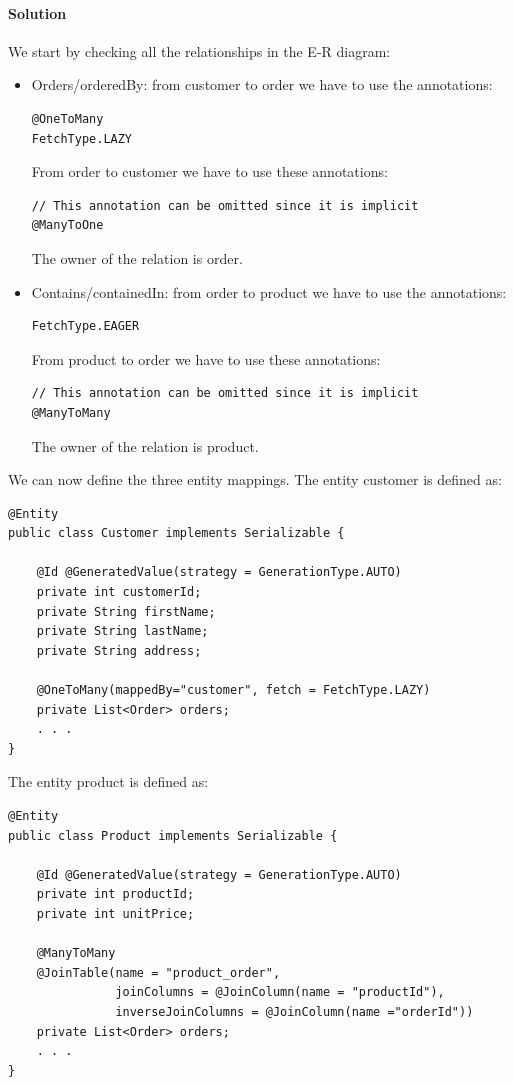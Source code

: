 \paragraph*{Solution}
We start by checking all the relationships in the E-R diagram: 
\begin{itemize}
    \item Orders/orderedBy: from customer to order we have to use the annotations: 
        \begin{lstlisting}[style=Java]
@OneToMany
FetchType.LAZY
        \end{lstlisting}
        From order to customer we have to use these annotations: 
        \begin{lstlisting}[style=Java]
// This annotation can be omitted since it is implicit
@ManyToOne
        \end{lstlisting}
        The owner of the relation is order. 
    \item Contains/containedIn: from order to product we have to use the annotations: 
        \begin{lstlisting}[style=Java]
FetchType.EAGER
        \end{lstlisting}
        From product to order we have to use these annotations: 
        \begin{lstlisting}[style=Java]
// This annotation can be omitted since it is implicit
@ManyToMany
        \end{lstlisting}
        The owner of the relation is product. 
\end{itemize}
We can now define the three entity mappings. 
The entity customer is defined as:  
\begin{lstlisting}[style=Java]
@Entity
public class Customer implements Serializable {

    @Id @GeneratedValue(strategy = GenerationType.AUTO)
    private int customerId;
    private String firstName;
    private String lastName;
    private String address;

    @OneToMany(mappedBy="customer", fetch = FetchType.LAZY)
    private List<Order> orders;
    . . .
}
\end{lstlisting}
The entity product is defined as:  
\begin{lstlisting}[style=Java]
@Entity
public class Product implements Serializable {

    @Id @GeneratedValue(strategy = GenerationType.AUTO)
    private int productId;
    private int unitPrice;

    @ManyToMany
    @JoinTable(name = "product_order",
               joinColumns = @JoinColumn(name = "productId"),
               inverseJoinColumns = @JoinColumn(name ="orderId"))
    private List<Order> orders; 
    . . .
}
\end{lstlisting}
